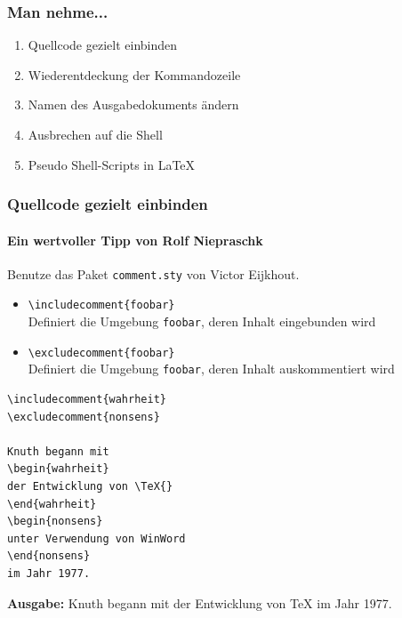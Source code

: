\documentclass[]{beamer}
\begin{document}
\begin{frame}
\frametitle{Man nehme...}

\vfill

\begin{enumerate}[<+->]
\item Quellcode gezielt einbinden
\item Wiederentdeckung der Kommandozeile
\item Namen des Ausgabedokuments ändern
\item Ausbrechen auf die Shell
\item Pseudo Shell-Scripts in \LaTeX\
\end{enumerate}

\vfill
\end{frame}

\begin{frame}[fragile]
\frametitle{Quellcode gezielt einbinden}
\framesubtitle{Ein wertvoller Tipp von Rolf Niepraschk}

Benutze das Paket \texttt{comment.sty} von Victor Eijkhout.

\pause

\begin{itemize}
\item \verb+\includecomment{foobar}+\\
Definiert die Umgebung \texttt{foobar}, deren Inhalt eingebunden wird
\item \verb+\excludecomment{foobar}+\\
Definiert die Umgebung \texttt{foobar}, deren Inhalt auskommentiert wird
\end{itemize}

\pause\hfill
\begin{minipage}{0.45\linewidth}
\begin{lstlisting}[style=arn:lst:tex]
\includecomment{wahrheit}
\excludecomment{nonsens}

Knuth begann mit
\begin{wahrheit}
der Entwicklung von \TeX{}
\end{wahrheit}
\begin{nonsens}
unter Verwendung von WinWord
\end{nonsens}
im Jahr 1977.
\end{lstlisting}
\end{minipage}
\hfill\strut

\pause\textbf{Ausgabe:} \: Knuth begann mit der Entwicklung von \TeX{} im Jahr 1977.


\end{frame}
\end{document}
